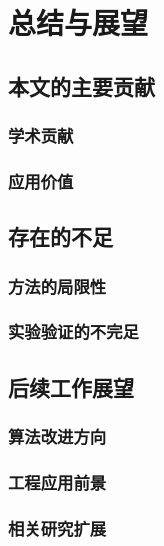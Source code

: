 \chapter{总结与展望}

\section{本文的主要贡献}

\subsection{学术贡献}

\subsection{应用价值}

\section{存在的不足}

\subsection{方法的局限性}

\subsection{实验验证的不完足}

\section{后续工作展望}

\subsection{算法改进方向}

\subsection{工程应用前景}

\subsection{相关研究扩展}

\newpage
